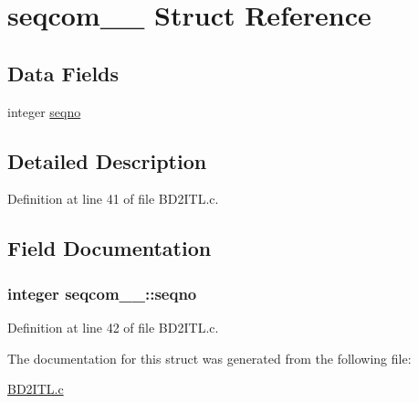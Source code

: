 \hypertarget{structseqcom__1__}{}\section{seqcom\+\_\+\_\+ Struct Reference}
\label{structseqcom__1__}
\subsection*{Data Fields}
\begin{DoxyCompactItemize}
\item 
integer \hyperlink{structseqcom__1___a83235bdd7767ad43626c1cff3fe19cc1}{seqno}
\end{DoxyCompactItemize}


\subsection{Detailed Description}


Definition at line 41 of file B\+D2\+I\+T\+L.\+c.



\subsection{Field Documentation}
\subsubsection[{\texorpdfstring{seqno}{seqno}}]{\setlength{\rightskip}{0pt plus 5cm}integer seqcom\+\_\+\_\+\+::seqno}\hypertarget{structseqcom__1___a83235bdd7767ad43626c1cff3fe19cc1}{}\label{structseqcom__1___a83235bdd7767ad43626c1cff3fe19cc1}


Definition at line 42 of file B\+D2\+I\+T\+L.\+c.



The documentation for this struct was generated from the following file\+:\begin{DoxyCompactItemize}
\item 
\hyperlink{BD2ITL_8c}{B\+D2\+I\+T\+L.\+c}\end{DoxyCompactItemize}
